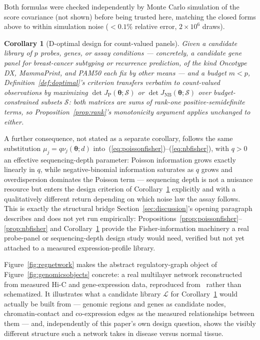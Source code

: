 \documentclass[11pt]{article}
\newtheorem{Corollary}{Corollary}
\begin{document}
Both formulas were checked independently by Monte Carlo simulation of the score covariance (not shown) before being trusted here, matching the closed forms above to within simulation noise ($<0.1\%$ relative error, $2\times10^6$ draws).

\begin{Corollary}[D-optimal design for count-valued panels]
\label{cor:genomicdopt}
Given a candidate library of $p$ probes, genes, or assay conditions --- concretely, a candidate gene panel for breast-cancer subtyping or recurrence prediction, of the kind Oncotype DX, MammaPrint, and PAM50 each fix by other means --- and a budget $m<p$, Definition~\ref{def:doptimal}'s criterion transfers verbatim to count-valued observations by maximizing $\det J_{\mathrm P}(\boldsymbol\theta;\mathcal{S})$ or $\det J_{\mathrm{NB}}(\boldsymbol\theta;\mathcal{S})$ over budget-constrained subsets $\mathcal{S}$: both matrices are sums of rank-one positive-semidefinite terms, so Proposition~\ref{prop:rank}'s monotonicity argument applies unchanged to either.
\end{Corollary}

A further consequence, not stated as a separate corollary, follows the same substitution $\mu_j=q\nu_j(\boldsymbol\theta;d)$ into~(\ref{eq:poissonfisher})--(\ref{eq:nbfisher}), with $q>0$ an effective sequencing-depth parameter: Poisson information grows exactly linearly in $q$, while negative-binomial information saturates as $q$ grows and overdispersion dominates the Poisson term --- sequencing depth is not a nuisance resource but enters the design criterion of Corollary~\ref{cor:genomicdopt} explicitly and with a qualitatively different return depending on which noise law the assay follows. This is exactly the structural bridge Section~\ref{sec:discussion}'s opening paragraph describes and does not yet run empirically: Propositions~\ref{prop:poissonfisher}--\ref{prop:nbfisher} and Corollary~\ref{cor:genomicdopt} provide the Fisher-information machinery a real probe-panel or sequencing-depth design study would need, verified but not yet attached to a measured expression-profile library.

Figure~\ref{fig:regnetwork} makes the abstract regulatory-graph object of Figure~\ref{fig:genomicsobjects} concrete: a real multilayer network reconstructed from measured Hi-C and gene-expression data, reproduced from~\citep{ref36} rather than schematized. It illustrates what a candidate library $\mathcal{L}$ for Corollary~\ref{cor:genomicdopt} would actually be built from --- genomic regions and genes as candidate nodes, chromatin-contact and co-expression edges as the measured relationships between them --- and, independently of this paper's own design question, shows the visibly different structure such a network takes in disease versus normal tissue.
\end{document}
